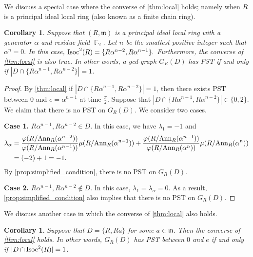\documentclass[12pt, a4paper]{amsart}
\newtheorem{cor}[thm]{Corollary}
\theoremstyle{definition}
\DeclareMathOperator{\F}{\mathbb{F}}
\newcommand{\Ann}{{\rm Ann}}
\numberwithin{equation}{section}
\newcommand{\Isoc}{{{\rm Isoc}}}
\begin{document}
We discuss a special case where the converse of \cref{thm:local} holds; namely when $R$ is a principal ideal local ring (also known as a finite chain ring). 
\begin{cor}
    Suppose that $(R,\mathfrak{m})$ is a principal ideal local ring with a generator $\alpha$ and residue field $\F_2$. Let $n$ be the smallest positive integer such that $\alpha^n=0.$ In this case, $\Isoc^2(R)= \{R\alpha^{n-2}, R \alpha^{n-1}\}.$  Furthermore, the converse of \cref{thm:local} is also true. In other words, a gcd-graph $G_R(D)$ has PST if and only if $|D \cap \{R\alpha^{n-1}, R\alpha^{n-2}\}| =1$. 
\end{cor}

\begin{proof}
    By \cref{thm:local} if $|D \cap \{R\alpha^{n-1}, R\alpha^{n-2}\}| =1$, then there exists PST between $0$ and $e=\alpha^{n-1}$ at time $\frac{\pi}{2}.$ Suppose that $|D \cap \{R\alpha^{n-1}, R\alpha^{n-2}\}| \in \{0, 2\}$. We claim that there is no PST on $G_{R}(D).$ We consider two cases. 

    \noindent\textbf{Case 1.} $R \alpha^{n-1}, R \alpha^{n-2} \in D.$ In this case, we have $\lambda_1 = -1$ and
    \begin{align*}
     \lambda_{\alpha} &= \frac{\varphi(R/\Ann_{R}(\alpha^{n-2}))}{\varphi(R/\Ann_{R}(\alpha^{n-1}))} \mu(R/\Ann_{R}(\alpha^{n-1}))+ \frac{\varphi(R/\Ann_{R}(\alpha^{n-1}))}{\varphi(R/\Ann_{R}(\alpha^{n}))} \mu(R/\Ann_{R}(\alpha^{n})) 
     \\ &= (-2)+1 = -1. 
    \end{align*}
    By \cref{prop:simplified_condition}, there is no PST on $G_R(D).$
    
    \noindent \textbf{Case 2.} $R \alpha^{n-1}, R \alpha^{n-2} \not \in D.$ In this case, $\lambda_1 = \lambda_{\alpha}=0.$ As a result, \cref{prop:simplified_condition} also implies that there is no PST on $G_R(D).$
\end{proof}


We discuss another case in which the converse of \cref{thm:local} also holds. 

\begin{cor}
    Suppose that $D = \{R, Ra \}$ for some $a \in \mathfrak{m}.$ Then the converse of \cref{thm:local} holds. In other words, $G_{R}(D)$ has PST between $0$ and $e$ if and only if $|D \cap \Isoc^2(R)| =1$. 
\end{cor}
\end{document}
